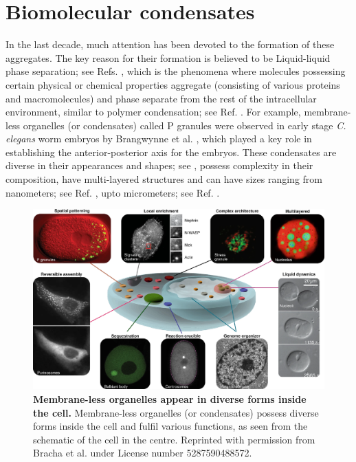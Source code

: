 \section{Biomolecular condensates}

In the last decade, much attention has been devoted to the formation of these aggregates.
The key reason for their formation is believed to be Liquid-liquid phase separation; see Refs. \cite{FloryBook,Keating2021}, which is the phenomena where molecules possessing certain physical or chemical properties aggregate (consisting of various proteins and macromolecules) and phase separate from the rest of the intracellular environment, similar to polymer condensation; see Ref. \cite{Hyman2014}.
For example, membrane-less organelles (or condensates) called P granules were observed in early stage \textit{C. elegans} worm embryos by Brangwynne et al. \cite{Brangwynne2009}, which played a key role in establishing the anterior-posterior axis for the embryos.
These condensates are diverse in their appearances and shapes; see , possess complexity in their composition, have multi-layered structures and can have sizes ranging from nanometers; see Ref. \cite{Sabari2018}, upto micrometers; see Ref. \cite{Feric2013}.
\begin{figure}[tb]
\centering
\includegraphics[scale=0.52]{MainContent/BioFigures/condensates_in_cells.pdf}
\caption{\textbf{Membrane-less organelles appear in diverse forms inside the cell.}
Membrane-less organelles (or condensates) possess diverse forms inside the cell and fulfil various functions, as seen from the schematic of the cell in the centre.
Reprinted with permission from Bracha et al. \cite{Bracha2019} under License number 5287590488572.
}
\label{fig:condensates_diverse}
\end{figure}

